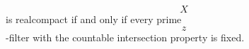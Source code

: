 $$X$$ is realcompact if and only if every prime $$z$$-filter with the countable intersection property is fixed.
